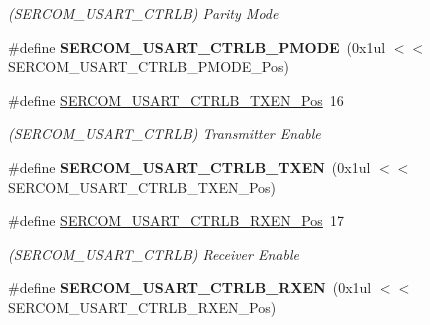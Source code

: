 \begin{DoxyCompactItemize}
\begin{DoxyCompactList}\small\item\em (S\+E\+R\+C\+O\+M\+\_\+\+U\+S\+A\+R\+T\+\_\+\+C\+T\+R\+L\+B) Parity Mode \end{DoxyCompactList}\item 
\hypertarget{group___s_a_m_l21___s_e_r_c_o_m_ga41386bd20707b1e8edb4e78e356e15bd}{}\#define {\bfseries S\+E\+R\+C\+O\+M\+\_\+\+U\+S\+A\+R\+T\+\_\+\+C\+T\+R\+L\+B\+\_\+\+P\+M\+O\+D\+E}~(0x1ul $<$$<$ S\+E\+R\+C\+O\+M\+\_\+\+U\+S\+A\+R\+T\+\_\+\+C\+T\+R\+L\+B\+\_\+\+P\+M\+O\+D\+E\+\_\+\+Pos)\label{group___s_a_m_l21___s_e_r_c_o_m_ga41386bd20707b1e8edb4e78e356e15bd}

\item 
\hypertarget{group___s_a_m_l21___s_e_r_c_o_m_gad79231677ec252cfca55bdb525b1676e}{}\#define \hyperlink{group___s_a_m_l21___s_e_r_c_o_m_gad79231677ec252cfca55bdb525b1676e}{S\+E\+R\+C\+O\+M\+\_\+\+U\+S\+A\+R\+T\+\_\+\+C\+T\+R\+L\+B\+\_\+\+T\+X\+E\+N\+\_\+\+Pos}~16\label{group___s_a_m_l21___s_e_r_c_o_m_gad79231677ec252cfca55bdb525b1676e}

\begin{DoxyCompactList}\small\item\em (S\+E\+R\+C\+O\+M\+\_\+\+U\+S\+A\+R\+T\+\_\+\+C\+T\+R\+L\+B) Transmitter Enable \end{DoxyCompactList}\item 
\hypertarget{group___s_a_m_l21___s_e_r_c_o_m_gaa3d0f673d3b42d21ecc3e92d9eea68f6}{}\#define {\bfseries S\+E\+R\+C\+O\+M\+\_\+\+U\+S\+A\+R\+T\+\_\+\+C\+T\+R\+L\+B\+\_\+\+T\+X\+E\+N}~(0x1ul $<$$<$ S\+E\+R\+C\+O\+M\+\_\+\+U\+S\+A\+R\+T\+\_\+\+C\+T\+R\+L\+B\+\_\+\+T\+X\+E\+N\+\_\+\+Pos)\label{group___s_a_m_l21___s_e_r_c_o_m_gaa3d0f673d3b42d21ecc3e92d9eea68f6}

\item 
\hypertarget{group___s_a_m_l21___s_e_r_c_o_m_ga815a8434a10377541566a72f5fab4d25}{}\#define \hyperlink{group___s_a_m_l21___s_e_r_c_o_m_ga815a8434a10377541566a72f5fab4d25}{S\+E\+R\+C\+O\+M\+\_\+\+U\+S\+A\+R\+T\+\_\+\+C\+T\+R\+L\+B\+\_\+\+R\+X\+E\+N\+\_\+\+Pos}~17\label{group___s_a_m_l21___s_e_r_c_o_m_ga815a8434a10377541566a72f5fab4d25}

\begin{DoxyCompactList}\small\item\em (S\+E\+R\+C\+O\+M\+\_\+\+U\+S\+A\+R\+T\+\_\+\+C\+T\+R\+L\+B) Receiver Enable \end{DoxyCompactList}\item 
\hypertarget{group___s_a_m_l21___s_e_r_c_o_m_gab8bb6a17cafc60be185c1b956c2aae65}{}\#define {\bfseries S\+E\+R\+C\+O\+M\+\_\+\+U\+S\+A\+R\+T\+\_\+\+C\+T\+R\+L\+B\+\_\+\+R\+X\+E\+N}~(0x1ul $<$$<$ S\+E\+R\+C\+O\+M\+\_\+\+U\+S\+A\+R\+T\+\_\+\+C\+T\+R\+L\+B\+\_\+\+R\+X\+E\+N\+\_\+\+Pos)\label{group___s_a_m_l21___s_e_r_c_o_m_gab8bb6a17cafc60be185c1b956c2aae65}


\end{DoxyCompactItemize}
